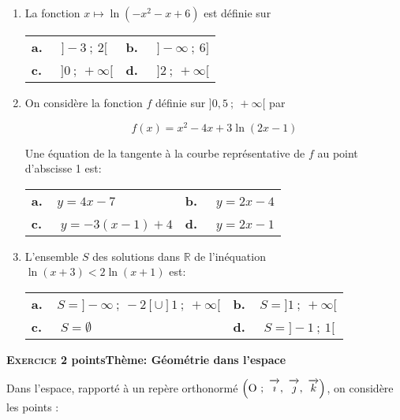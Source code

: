 \documentclass[10pt,a4paper]{article}
\newcommand{\R}{\mathbb{R}}
\newcommand{\vect}[1]{\overrightarrow{\,\mathstrut#1\,}}
\def\Oijk{$\left(\text{O}~;~\vect{\imath},~\vect{\jmath},~\vect{k}\right)$}
\begin{document}
\begin{enumerate}
\item La  fonction $x \longmapsto  \ln \left(-x^2- x + 6\right)$ est définie sur

\begin{center}
\begin{tabularx}{\linewidth}{*{2}{X}}
\textbf{a.~~} $]- 3~;~2[$&\textbf{b.~~} $]- \infty~;~6]$\\
\textbf{c.~~} $]0~;~+\infty[$&\textbf{d.~~} $]2~;~+\infty[$
\end{tabularx}
\end{center}

\item On considère la fonction $f$ définie sur $]0,5~;~+ \infty [$ par 

\[f(x) =x^2- 4x+ 3 \ln (2x - 1)\]

Une équation de la tangente à la courbe représentative de $f$ au point d'abscisse 1 est:

\begin{center}
\begin{tabularx}{\linewidth}{*{2}{X}}
\textbf{a.~~}$y = 4x- 7$ &\textbf{b.~~} $y = 2x - 4$\\
\textbf{c.~~} $y = -3(x - 1) + 4$ &\textbf{d.~~} $y = 2x - 1$
\end{tabularx}
\end{center}

\item L'ensemble $S$ des solutions dans $\R$ de l'inéquation $\ln (x + 3) < 2\ln (x + 1)$ est:

\begin{center}
\begin{tabularx}{\linewidth}{*{2}{X}}
\textbf{a.~~}$S = ]- \infty~;~-2[ \cup ]1~;~+\infty[$&\textbf{b.~~}$S = ]1~;~+ \infty[$\\
\textbf{c.~~} $S = \emptyset$&\textbf{d.~~} $S = ]- 1~;~1[$
\end{tabularx}
\end{center}

\end{enumerate}

\bigskip

\textbf{\textsc{Exercice 2}  points\hfill Thème: Géométrie dans l'espace}

\medskip

Dans l'espace, rapporté à un repère orthonormé \Oijk, on considère les points : 
\end{document}
